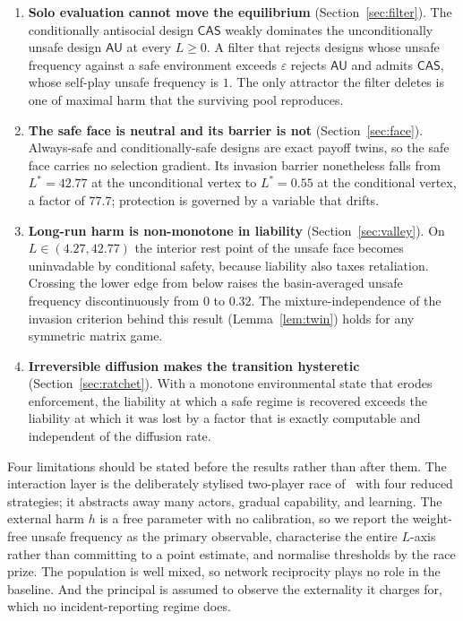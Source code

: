 \documentclass[pdflatex]{sn-jnl}
\theoremstyle{thmstyleone}
\theoremstyle{thmstylethree}
\theoremstyle{thmstyletwo}
\newcommand{\AU}{\textsf{AU}}
\newcommand{\CAS}{\textsf{CAS}}
\begin{document}
\begin{enumerate}
\item \textbf{Solo evaluation cannot move the equilibrium}
(Section~\ref{sec:filter}). The conditionally antisocial design $\CAS$ weakly
dominates the unconditionally unsafe design $\AU$ at every $L\ge0$. A filter
that rejects designs whose unsafe frequency against a safe environment exceeds
$\varepsilon$ rejects $\AU$ and admits $\CAS$, whose self-play unsafe
frequency is $1$. The only attractor the filter deletes is one of maximal
harm that the surviving pool reproduces.

\item \textbf{The safe face is neutral and its barrier is not}
(Section~\ref{sec:face}). Always-safe and conditionally-safe designs are exact
payoff twins, so the safe face carries no selection gradient. Its invasion
barrier nonetheless falls from $L^{*}=42.77$ at the unconditional vertex to
$L^{*}=0.55$ at the conditional vertex, a factor of $77.7$; protection is
governed by a variable that drifts.

\item \textbf{Long-run harm is non-monotone in liability}
(Section~\ref{sec:valley}). On $L\in(4.27,42.77)$ the interior rest point of
the unsafe face becomes uninvadable by conditional safety, because liability
also taxes retaliation. Crossing the lower edge from below raises the
basin-averaged unsafe frequency discontinuously from $0$ to $0.32$. The
mixture-independence of the invasion criterion behind this result
(Lemma~\ref{lem:twin}) holds for any symmetric matrix game.

\item \textbf{Irreversible diffusion makes the transition hysteretic}
(Section~\ref{sec:ratchet}). With a monotone environmental state that erodes
enforcement, the liability at which a safe regime is recovered exceeds the
liability at which it was lost by a factor that is exactly computable and
independent of the diffusion rate.
\end{enumerate}

Four limitations should be stated before the results rather than after them.
The interaction layer is the deliberately stylised two-player race of~\citet{domingos2026falling} with four reduced strategies; it abstracts away
many actors, gradual capability, and learning. The external harm $h$ is a free
parameter with no calibration, so we report the weight-free unsafe frequency
as the primary observable, characterise the entire $L$-axis rather than
committing to a point estimate, and normalise thresholds by the race prize.
The population is well mixed, so network reciprocity plays no role in the
baseline. And the principal is assumed to observe the externality it charges
for, which no incident-reporting regime does.
\end{document}
